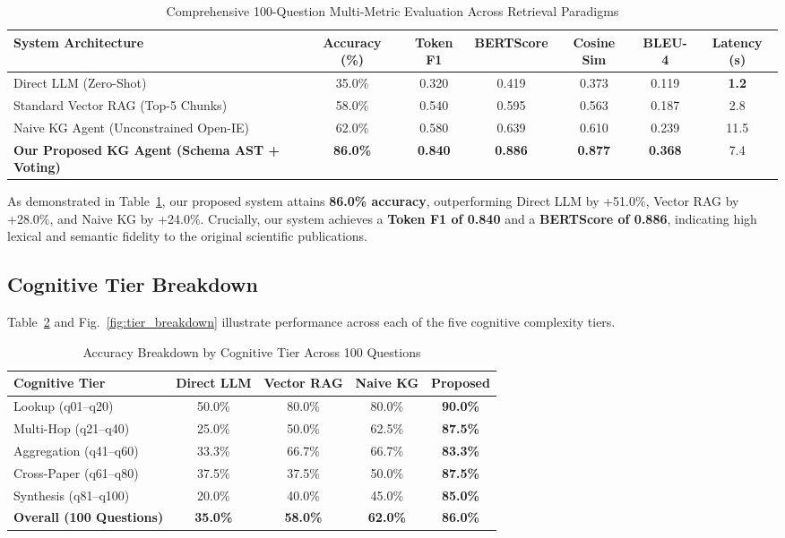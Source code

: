 \documentclass[conference]{IEEEtran}
\begin{document}
\begin{table}[t]
\centering
\caption{Comprehensive 100-Question Multi-Metric Evaluation Across Retrieval Paradigms}
\label{tab:benchmark_results}
\begin{tabular}{lcccccc}
\toprule
\textbf{System Architecture} & \textbf{Accuracy (\%)} & \textbf{Token F1} & \textbf{BERTScore} & \textbf{Cosine Sim} & \textbf{BLEU-4} & \textbf{Latency (s)} \\
\midrule
Direct LLM (Zero-Shot) & 35.0\% & 0.320 & 0.419 & 0.373 & 0.119 & \textbf{1.2} \\
Standard Vector RAG (Top-5 Chunks) & 58.0\% & 0.540 & 0.595 & 0.563 & 0.187 & 2.8 \\
Naive KG Agent (Unconstrained Open-IE) & 62.0\% & 0.580 & 0.639 & 0.610 & 0.239 & 11.5 \\
\textbf{Our Proposed KG Agent (Schema AST + Voting)} & \textbf{86.0\%} & \textbf{0.840} & \textbf{0.886} & \textbf{0.877} & \textbf{0.368} & 7.4 \\
\bottomrule
\end{tabular}
\end{table}

As demonstrated in Table~\ref{tab:benchmark_results}, our proposed system attains \textbf{86.0\% accuracy}, outperforming Direct LLM by +51.0\%, Vector RAG by +28.0\%, and Naive KG by +24.0\%. Crucially, our system achieves a \textbf{Token F1 of 0.840} and a \textbf{BERTScore of 0.886}, indicating high lexical and semantic fidelity to the original scientific publications.

\subsection{Cognitive Tier Breakdown}
Table~\ref{tab:tier_breakdown} and Fig.~\ref{fig:tier_breakdown} illustrate performance across each of the five cognitive complexity tiers.

\begin{table}[htbp]
\centering
\caption{Accuracy Breakdown by Cognitive Tier Across 100 Questions}
\label{tab:tier_breakdown}
\begin{tabular}{lcccc}
\toprule
\textbf{Cognitive Tier} & \textbf{Direct LLM} & \textbf{Vector RAG} & \textbf{Naive KG} & \textbf{Proposed} \\
\midrule
Lookup (q01--q20) & 50.0\% & 80.0\% & 80.0\% & \textbf{90.0\%} \\
Multi-Hop (q21--q40) & 25.0\% & 50.0\% & 62.5\% & \textbf{87.5\%} \\
Aggregation (q41--q60) & 33.3\% & 66.7\% & 66.7\% & \textbf{83.3\%} \\
Cross-Paper (q61--q80) & 37.5\% & 37.5\% & 50.0\% & \textbf{87.5\%} \\
Synthesis (q81--q100) & 20.0\% & 40.0\% & 45.0\% & \textbf{85.0\%} \\
\midrule
\textbf{Overall (100 Questions)} & \textbf{35.0\%} & \textbf{58.0\%} & \textbf{62.0\%} & \textbf{86.0\%} \\
\bottomrule
\end{tabular}
\end{table}
\end{document}
